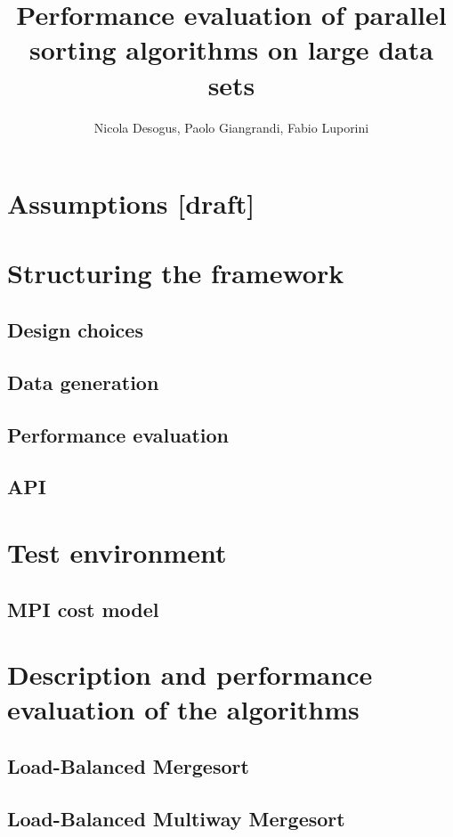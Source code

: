 \documentclass[a4paper,12pt,oneside,openright]{article}
\title{Performance evaluation of parallel sorting algorithms on large data sets}
\author{Nicola Desogus, Paolo Giangrandi, Fabio Luporini}
\begin{document}
\maketitle
\tableofcontents
\pagebreak





\section{Assumptions [draft]}


\section{Structuring the framework}
\subsection{Design choices}
\subsection{Data generation}
\subsection{Performance evaluation}
\subsection{API}

\section{Test environment}
\subsection{MPI cost model}

\pagebreak

\section{Description and performance evaluation of the algorithms}




\subsection{Load-Balanced Mergesort}
\subsection{Load-Balanced Multiway Mergesort}
\end{document}

